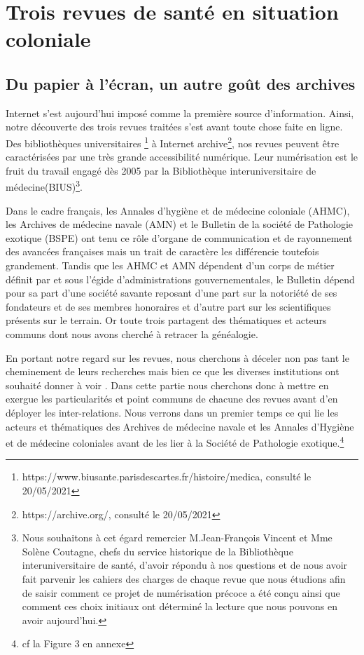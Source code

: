 \chapter{Trois revues de santé en situation coloniale}

\section*{Du papier à l'écran, un autre goût des archives}


Internet s’est aujourd’hui imposé comme la première source d’information. Ainsi, notre découverte des trois revues traitées s'est avant toute chose faite en ligne. Des bibliothèques universitaires
\footnote{https://www.biusante.parisdescartes.fr/histoire/medica, consulté le 20/05/2021} à Internet archive\footnote{https://archive.org/, consulté le 20/05/2021}, nos revues peuvent être caractérisées par une très grande accessibilité numérique. 
Leur numérisation est le fruit du travail engagé dès 2005 par la Bibliothèque interuniversitaire de médecine(BIUS)\footnote{Nous souhaitons à cet égard remercier M.Jean-François Vincent et Mme Solène Coutagne, chefs du service historique de la Bibliothèque interuniversitaire de santé, d'avoir répondu à nos questions et de nous avoir fait parvenir les cahiers des charges de chaque revue que nous étudions afin de saisir comment ce projet de numérisation précoce a été conçu ainsi que comment ces choix initiaux ont déterminé la lecture que nous pouvons en avoir aujourd'hui.}. 

Dans le cadre français, les Annales d’hygiène et de médecine coloniale (AHMC), les Archives de médecine navale (AMN) et le Bulletin de la société de Pathologie exotique (BSPE) ont tenu ce rôle d’organe de communication et de rayonnement des avancées françaises mais un trait de caractère les différencie toutefois grandement. Tandis que les AHMC et AMN dépendent d'un corps de métier définit par et sous l'égide d'administrations gouvernementales, le Bulletin dépend pour sa part d'une société savante reposant d'une part sur la notoriété de ses fondateurs et de ses membres honoraires et d'autre part sur les scientifiques présents sur le terrain. Or toute trois partagent des thématiques et acteurs communs dont nous avons cherché à retracer la généalogie.

En portant notre regard sur les revues, nous cherchons à déceler non pas tant le cheminement de leurs recherches mais bien ce que les diverses institutions ont souhaité \og donner à voir \fg. Dans cette partie nous cherchons donc à mettre en exergue les particularités et point communs de chacune des revues avant d'en déployer les inter-relations. Nous verrons dans un premier temps ce qui lie les acteurs et thématiques des Archives de médecine navale et les Annales d'Hygiène et de médecine coloniales avant de les lier à la Société de Pathologie exotique.\footnote{cf la Figure 3 en annexe} 


